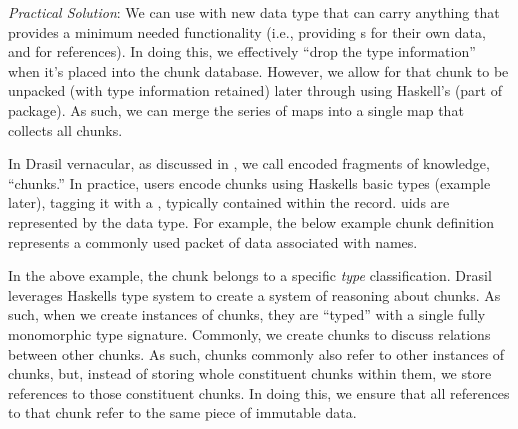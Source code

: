 \begin{writingdirectives}
      \item \textit{Practical Solution}: We can use \ExistentialQuantification{}
            with new data type that can carry anything that provides a minimum
            needed functionality (i.e., providing \UID{}s for their own data,
            and for references). In doing this, we effectively ``drop the type
            information'' when it's placed into the chunk database. However, we
            allow for that chunk to be unpacked (with type information retained)
            later through using Haskell's  (part of
             package). As such, we can merge the series of maps
            into a single map that collects all chunks.

\end{writingdirectives}

In Drasil vernacular, as discussed in , we call encoded
fragments of knowledge, ``chunks.'' In practice, users encode chunks using
Haskells basic  types (example later), tagging it with a
, typically contained within the record. \acsp{uid} are represented by
the \UID{} data type. For example,  the below example chunk definition represents a
commonly used packet of data associated with names.



In the above example, the chunk belongs to a specific \textit{type}
classification. Drasil
leverages Haskells type system to create a system of reasoning about chunks. As
such, when we create instances of chunks, they are ``typed'' with a single fully
monomorphic type signature. Commonly, we create chunks to discuss relations
between other chunks. As such, chunks commonly also refer to other instances of
chunks, but, instead of storing whole constituent chunks within them, we store
\UID{} references to those constituent chunks. In doing this, we ensure that all
references to that chunk refer to the same piece of immutable data.


